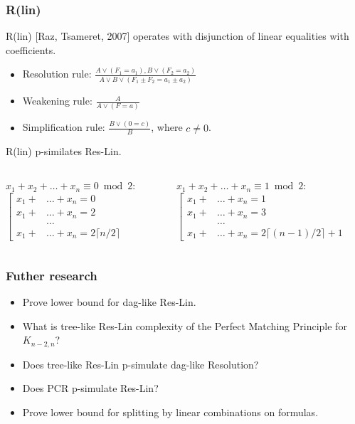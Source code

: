 \begin{frame}
    \frametitle{R(lin)}

    R(lin) [Raz, Tsameret, 2007] operates with disjunction of linear equalities with
     coefficients.
    
	\begin{itemize}
		\item Resolution rule: $\frac{A \lor (F_1 = a_1), B \lor (F_2 = a_2)}
    		{A \lor B \lor (F_1 \pm F_2 = a_1 \pm a_2)}$
		\item Weakening rule: $\frac{A}{A \lor (F = a)}$
		\item Simplification rule: $\frac{B \lor (0 = c)}{B}$, where $c \neq 0$. 
	\end{itemize}

	\pause
    \begin{theorem}
    	R(lin) p-similates Res-Lin.    
    \end{theorem}
    
	\medskip

	\pause
	\begin{columns}
		\begin{column}{5cm}
			$x_1 + x_2 + \dots + x_n \equiv 0 \bmod 2$:
			$\left[\begin{aligned}
            	x_1 + &\dots + x_n = 0\\
                x_1 + &\dots + x_n = 2\\
                &\dots \\
                x_1 + &\dots + x_n = 2 \lceil n / 2 \rceil
            \end{aligned}\right.$ 
		\end{column}
		\begin{column}{5cm}
			$x_1 + x_2 + \dots + x_n \equiv 1 \bmod 2$:
			$\left[\begin{aligned}
                x_1 + &\dots + x_n = 1\\
                x_1 + &\dots + x_n = 3\\
                &\dots \\
                x_1 + &\dots + x_n = 2 \lceil (n - 1) / 2 \rceil + 1
            \end{aligned}\right.$
		\end{column}
	\end{columns}
\end{frame}


\begin{frame}
    \frametitle{Futher research}

    \begin{itemize}
		\item Prove lower bound for dag-like Res-Lin.
		\item What is tree-like Res-Lin complexity of the Perfect Matching Principle
		    for $K_{n - 2, n}$? 
		\item Does tree-like Res-Lin p-simulate dag-like Resolution?
		\item Does PCR p-simulate Res-Lin?
		\item Prove lower bound for splitting by linear combinations on
		     formulas.
	\end{itemize}
\end{frame}


